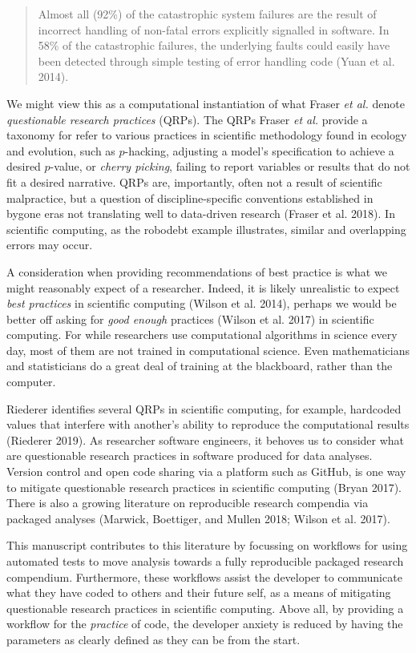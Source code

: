 \documentclass[
]{article}
\begin{document}
\begin{quote}
Almost all (92\%) of the catastrophic system failures are the result of incorrect handling of non-fatal errors explicitly signalled in software. In 58\% of the catastrophic failures, the underlying faults could easily have been detected through simple testing of error handling code (Yuan et al. 2014).
\end{quote}

We might view this as a computational instantiation of what Fraser \emph{et al.} denote \emph{questionable research practices} (QRPs). The QRPs Fraser \emph{et al.} provide a taxonomy for refer to various practices in scientific methodology found in ecology and evolution, such as \(p\)-hacking, adjusting a model's specification to achieve a desired \(p\)-value, or \emph{cherry picking}, failing to report variables or results that do not fit a desired narrative. QRPs are, importantly, often not a result of scientific malpractice, but a question of discipline-specific conventions established in bygone eras not translating well to data-driven research (Fraser et al. 2018). In scientific computing, as the robodebt example illustrates, similar and overlapping errors may occur.

A consideration when providing recommendations of best practice is what we might reasonably expect of a researcher. Indeed, it is likely unrealistic to expect \emph{best practices} in scientific computing (Wilson et al. 2014), perhaps we would be better off asking for \emph{good enough} practices (Wilson et al. 2017) in scientific computing. For while researchers use computational algorithms in science every day, most of them are not trained in computational science. Even mathematicians and statisticians do a great deal of training at the blackboard, rather than the computer.

Riederer identifies several QRPs in scientific computing, for example, hardcoded values that interfere with another's ability to reproduce the computational results (Riederer 2019). As researcher software engineers, it behoves us to consider what are questionable research practices in software produced for data analyses. Version control and open code sharing via a platform such as GitHub, is one way to mitigate questionable research practices in scientific computing (Bryan 2017). There is also a growing literature on reproducible research compendia via packaged analyses (Marwick, Boettiger, and Mullen 2018; Wilson et al. 2017).

This manuscript contributes to this literature by focussing on workflows for using automated tests to move analysis towards a fully reproducible packaged research compendium. Furthermore, these workflows assist the developer to communicate what they have coded to others and their future self, as a means of mitigating questionable research practices in scientific computing. Above all, by providing a workflow for the \emph{practice} of code, the developer anxiety is reduced by having the parameters as clearly defined as they can be from the start.
\end{document}
